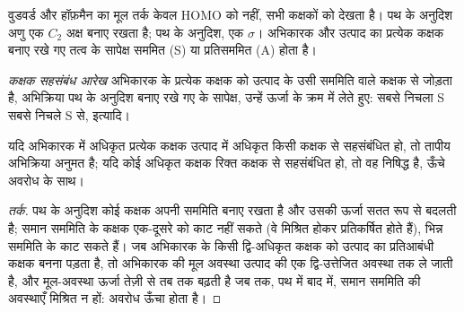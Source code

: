 वुडवर्ड और हॉफ़मैन का मूल तर्क केवल HOMO को नहीं, सभी कक्षकों को
देखता है।  पथ के अनुदिश अणु एक $C_2$ अक्ष बनाए रखता है;
 पथ के अनुदिश, एक  $\sigma$। अभिकारक और
उत्पाद का प्रत्येक कक्षक बनाए रखे गए तत्व के सापेक्ष सममित (S) या प्रतिसममित (A)
होता है।

\begin{definition}[कक्षक सहसंबंध आरेख]\label{def:b3:pericyclic:orbital-correlation}
\emph{कक्षक सहसंबंध आरेख} अभिकारक के
प्रत्येक कक्षक को उत्पाद के उसी सममिति वाले कक्षक से जोड़ता है,
अभिक्रिया पथ के अनुदिश बनाए रखे गए  के सापेक्ष, उन्हें
ऊर्जा के क्रम में लेते हुए: सबसे निचला S सबसे निचले S से, इत्यादि।
\end{definition}

\begin{proposition}[कक्षक सममिति का संरक्षण]\label{prop:b3:pericyclic:correlation}
यदि अभिकारक में अधिकृत प्रत्येक कक्षक उत्पाद में अधिकृत किसी कक्षक से
सहसंबंधित हो, तो तापीय अभिक्रिया अनुमत है; यदि कोई अधिकृत कक्षक
रिक्त कक्षक से सहसंबंधित हो, तो वह निषिद्ध है, ऊँचे अवरोध के साथ।
\end{proposition}

\begin{proof}[तर्क]
पथ के अनुदिश कोई कक्षक अपनी सममिति बनाए रखता है और उसकी ऊर्जा सतत रूप से
बदलती है; समान सममिति के कक्षक एक-दूसरे को काट नहीं सकते (वे मिश्रित होकर प्रतिकर्षित होते हैं),
भिन्न सममिति के काट सकते हैं। जब अभिकारक के किसी द्वि-अधिकृत कक्षक को
उत्पाद का प्रतिआबंधी कक्षक बनना पड़ता है, तो अभिकारक की मूल अवस्था
उत्पाद की एक द्वि-उत्तेजित अवस्था तक ले जाती है, और मूल-अवस्था
ऊर्जा तेज़ी से तब तक बढ़ती है जब तक, पथ में बाद में, समान सममिति की अवस्थाएँ
मिश्रित न हों: अवरोध ऊँचा होता है।
\end{proof}

